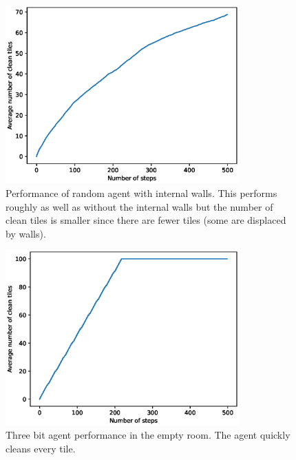 \documentclass{article}
\begin{document}
\begin{figure}[h!]
  \centering
  \includegraphics[width=0.8\textwidth]{RandomExtraWallPerformance}
  \caption{Performance of random agent with internal walls. This performs roughly as well as without the internal walls but the number of clean tiles is smaller since there are fewer tiles (some are displaced by walls).  }
  
\end{figure}



\begin{figure}[h!]
  \centering
  \includegraphics[width=0.8\textwidth]{FancyNoWallPerformance}
  \caption{Three bit agent performance in the empty room. The agent quickly cleans every tile. }
\end{figure}
\end{document}
